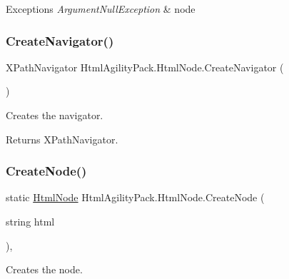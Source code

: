 \begin{DoxyExceptions}{Exceptions}
{\em Argument\+Null\+Exception} & node\\
\hline
\end{DoxyExceptions}
\mbox{\label{class_html_agility_pack_1_1_html_node_aa879c6526cae140c1243aed7a0265b36}} 
\subsubsection{\texorpdfstring{Create\+Navigator()}{CreateNavigator()}}
{\footnotesize\ttfamily X\+Path\+Navigator Html\+Agility\+Pack.\+Html\+Node.\+Create\+Navigator (\begin{DoxyParamCaption}{ }\end{DoxyParamCaption})\hspace{0.3cm}{\ttfamily [inline]}}



Creates the navigator. 

\begin{DoxyReturn}{Returns}
X\+Path\+Navigator.
\end{DoxyReturn}
\mbox{\label{class_html_agility_pack_1_1_html_node_ab6a41df0b0ebcc6af2c39524119f5dfd}} 
\subsubsection{\texorpdfstring{Create\+Node()}{CreateNode()}}
{\footnotesize\ttfamily static \hyperlink{class_html_agility_pack_1_1_html_node}{Html\+Node} Html\+Agility\+Pack.\+Html\+Node.\+Create\+Node (\begin{DoxyParamCaption}\item[{string}]{html }\end{DoxyParamCaption})\hspace{0.3cm}{\ttfamily [inline]}, {\ttfamily [static]}}



Creates the node. 


